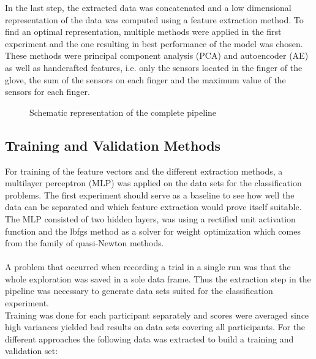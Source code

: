 In the last step, the extracted data was concatenated and a low dimensional representation of the data was computed using a feature extraction method. To find an optimal representation, multiple methods were applied in the first experiment and the one resulting in best performance of the model was chosen. These methods were principal component analysis (PCA) and autoencoder (AE) as well as handcrafted features, i.e. only the sensors located in the finger of the glove, the sum of the sensors on each finger and the maximum value of the sensors for each finger.

\begin{figure}[h]
	\caption{Schematic representation of the complete pipeline}
	\label{pipeline}
\end{figure}

\subsection{Training and Validation Methods}
For training of the feature vectors and the different extraction methods, a multilayer perceptron (MLP) was applied on the data sets for the classification problems. The first experiment should serve as a baseline to see how well the data can be separated and which feature extraction would prove itself suitable. The MLP consisted of two hidden layers, was using a rectified unit activation function and the lbfgs method as a solver for weight optimization which comes from the family of quasi-Newton methods.\\
\\
A problem that occurred when recording a trial in a single run was that the whole exploration was saved in a sole data frame. Thus the extraction step in the pipeline was necessary to generate data sets suited for the classification experiment.\\
Training was done for each participant separately and scores were averaged since high variances yielded bad results on data sets covering all participants. For the different approaches the following data was extracted to build a training and validation set:

